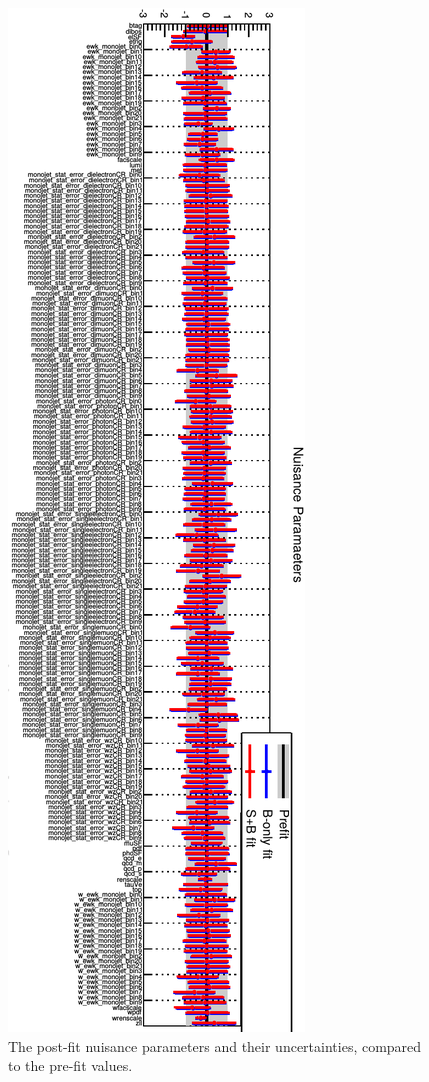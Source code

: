 \begin{figure}[ht]
  \centering
 \includegraphics[width=.45\textwidth]{nuisance_new.png} 
 \caption{The post-fit nuisance parameters and their uncertainties, compared to the pre-fit values.}
 \label{fig:nuisance}
\end{figure}


